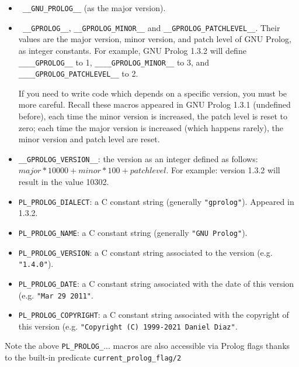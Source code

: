 \begin{itemize}

\item \texttt{ \_\_GNU\_PROLOG\_\_} (as the major version).

\item \texttt{ \_\_GPROLOG\_\_}, \texttt{\_\_GPROLOG\_MINOR\_\_} and
  \texttt{\_\_GPROLOG\_PATCHLEVEL\_\_}. Their values are the major version,
  minor version, and patch level of GNU Prolog, as integer constants. For
  example, GNU Prolog 1.3.2 will define \texttt{\_\_\_\_GPROLOG\_\_} to 1,
  \texttt{\_\_\_\_GPROLOG\_MINOR\_\_} to 3, and
  \texttt{\_\_\_\_GPROLOG\_PATCHLEVEL\_\_} to 2.

  If you need to write code which depends on a specific version, you must be
  more careful. Recall these macros appeared in GNU Prolog 1.3.1 (undefined
  before), each time the minor version is increased, the patch level is reset
  to zero; each time the major version is increased (which happens rarely),
  the minor version and patch level are reset.

\item \texttt{\_\_GPROLOG\_VERSION\_\_}: the version as an integer defined as
  follows: $major * 10000 + minor * 100 + patch level$. For example: version
  1.3.2 will result in the value 10302.

\item \texttt{PL\_PROLOG\_DIALECT}: a C constant string (generally
  \texttt{"gprolog"}). Appeared in 1.3.2.

\item \texttt{PL\_PROLOG\_NAME}: a C constant string (generally
  \texttt{"GNU Prolog"}).

\item \texttt{PL\_PROLOG\_VERSION}: a C constant string associated to the
  version (e.g. \texttt{"1.4.0"}).

\item \texttt{PL\_PROLOG\_DATE}: a C constant string associated with the date
  of this version (e.g. \texttt{"Mar 29 2011"}.

\item \texttt{PL\_PROLOG\_COPYRIGHT}: a C constant string associated with the
  copyright of this version (e.g. \texttt{"Copyright (C) 1999-2021 Daniel Diaz"}.

\end{itemize}

Note the above \texttt{PL\_PROLOG\_}... macros are also accessible via Prolog
flags thanks to the built-in predicate \texttt{current\_prolog\_flag/2}


